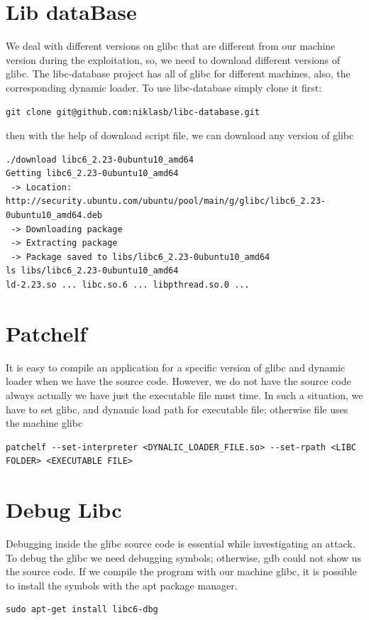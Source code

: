 \documentclass{masterthesis}
\newcommand*\libc{glibc}
\begin{document}
\section{Lib dataBase}
We deal with different versions on \libc{} that are different from our machine version during the exploitation, so, we need to download different versions of \libc{}. The libc-database project has all of \libc{} for different machines, also, the corresponding dynamic loader. To use libc-database simply clone it first:
\begin{lstlisting}[frame=tlrb]
git clone git@github.com:niklasb/libc-database.git
\end{lstlisting}
then with the help of download script file, we can download any version of \libc{}
\begin{lstlisting}[frame=tlrb]
./download libc6_2.23-0ubuntu10_amd64
Getting libc6_2.23-0ubuntu10_amd64
 -> Location: http://security.ubuntu.com/ubuntu/pool/main/g/glibc/libc6_2.23-0ubuntu10_amd64.deb
 -> Downloading package
 -> Extracting package
 -> Package saved to libs/libc6_2.23-0ubuntu10_amd64
ls libs/libc6_2.23-0ubuntu10_amd64
ld-2.23.so ... libc.so.6 ... libpthread.so.0 ...
\end{lstlisting}

\section{Patchelf}
It is easy to compile an application for a specific version of \libc{} and dynamic loader when we have the source code. However, we do not have the source code always actually we have just the executable file must time. In such a situation, we have to set \libc{}, and dynamic load path for executable file; otherwise file uses the machine \libc{}
\begin{lstlisting}[frame=tlrb]
patchelf --set-interpreter <DYNALIC_LOADER_FILE.so> --set-rpath <LIBC FOLDER> <EXECUTABLE FILE>
\end{lstlisting}

\section{Debug Libc}

Debugging inside the \libc{} source code is essential while investigating an attack. To debug the \libc{} we need debugging symbols; otherwise, gdb could not show us the source code. If we compile the program with our machine \libc{}, it is possible to install the symbols with the apt package manager.
\begin{lstlisting}[frame=tlrb]
sudo apt-get install libc6-dbg
\end{lstlisting}
\end{document}
